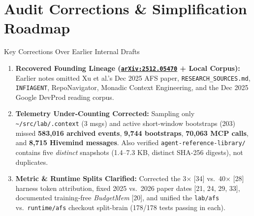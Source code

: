 \documentclass[10pt,letterpaper]{article}
\newcommand{\code}[1]{\texttt{\color{InkNavy}#1}}
\newcommand{\home}{\code{\textasciitilde}}
\newcommand{\arxiv}[1]{\href{https://arxiv.org/abs/#1}{\code{arXiv:#1}}}
\begin{document}
\section{Audit Corrections \& Simplification Roadmap}

\begin{auditbox}{Key Corrections Over Earlier Internal Drafts}
\begin{enumerate}\raggedright
  \item \textbf{Recovered Founding Lineage (\arxiv{2512.05470} + Local Corpus):} Earlier notes omitted Xu et al.'s Dec 2025 AFS paper, \code{RESEARCH\_SOURCES.md}, \code{INFIAGENT}, RepoNavigator, Monadic Context Engineering, and the Dec 2025 Google DevProd reading corpus.
  \item \textbf{Telemetry Under-Counting Corrected:} Sampling only \home\code{/src/lab/.context} (3 msgs) and active short-window bootstraps (203) missed \textbf{583,016 archived events}, \textbf{9,744 bootstraps}, \textbf{70,063 MCP calls}, and \textbf{8,715 Hivemind messages}. Also verified \code{agent-reference-library/} contains five \emph{distinct} snapshots (1.4--7.3 KB, distinct SHA-256 digests), not duplicates.
  \item \textbf{Metric \& Runtime Splits Clarified:} Corrected the 3$\times$ [34] vs.\ 40$\times$ [28] harness token attribution, fixed 2025 vs.\ 2026 paper dates [21, 24, 29, 33], documented training-free \emph{BudgetMem} [20], and unified the \code{lab/afs} vs.\ \code{runtime/afs} checkout split-brain (178/178 tests passing in each).
\end{enumerate}
\end{auditbox}
\end{document}
